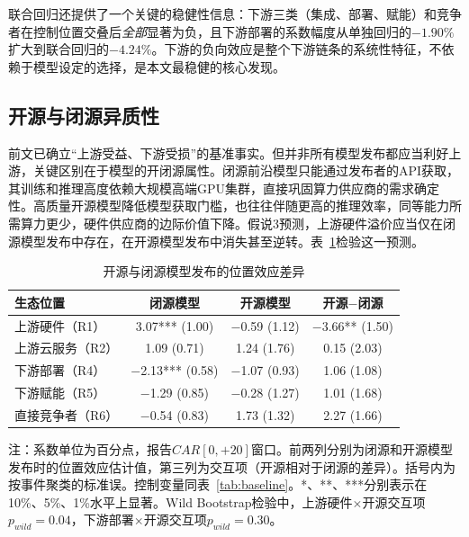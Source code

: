 \documentclass[11pt,fontset=fandol,a4paper]{ctexart}
\newcommand{\changed}[1]{{\color{orange!85!black}#1}}
\begin{document}
联合回归还提供了一个关键的稳健性信息：下游三类（集成、部署、赋能）和竞争者在控制位置交叠后\emph{全部}显著为负，且下游部署的系数幅度从单独回归的$-1.90\%$扩大到联合回归的$-4.24\%$。下游的负向效应是整个下游链条的系统性特征，不依赖于模型设定的选择，是本文最稳健的核心发现。

\subsection{开源与闭源异质性}\label{sec:openclose}

\changed{前文已确立“上游受益、下游受损”的基准事实。但并非所有模型发布都应当利好上游，关键区别在于模型的开闭源属性。闭源前沿模型只能通过发布者的API获取，其训练和推理高度依赖大规模高端GPU集群，直接巩固算力供应商的需求确定性。高质量开源模型降低模型获取门槛，也往往伴随更高的推理效率，同等能力所需算力更少，硬件供应商的边际价值下降。假说3预测，上游硬件溢价应当仅在闭源模型发布中存在，在开源模型发布中消失甚至逆转。表~\ref{tab:openclose}检验这一预测。}

\begin{table}[H]
\centering
\small
\begin{threeparttable}
\caption{开源与闭源模型发布的位置效应差异}
\label{tab:openclose}
\begin{tabular}{lccc}
\toprule
生态位置 & 闭源模型 & 开源模型 & 开源$-$闭源 \\
\midrule
上游硬件（R1） & 3.07*** (1.00) & $-$0.59 (1.12) & $-$3.66** (1.50) \\[3pt]
上游云服务（R2） & 1.09 (0.71) & 1.24 (1.76) & 0.15 (2.03) \\[3pt]
下游部署（R4） & $-$2.13*** (0.58) & $-$1.07 (0.93) & 1.06 (1.08) \\[3pt]
下游赋能（R5） & $-$1.29 (0.85) & $-$0.28 (1.27) & 1.01 (1.68) \\[3pt]
直接竞争者（R6） & $-$0.54 (0.83) & 1.73 (1.32) & 2.27 (1.66) \\
\bottomrule
\end{tabular}
\begin{tablenotes}
\footnotesize
\item 注：系数单位为百分点，报告$CAR[0,+20]$窗口。前两列分别为闭源和开源模型发布时的位置效应估计值，第三列为交互项（开源相对于闭源的差异）。括号内为按事件聚类的标准误。控制变量同表~\ref{tab:baseline}。*、**、***分别表示在10\%、5\%、1\%水平上显著。Wild Bootstrap检验中，上游硬件$\times$开源交互项$p_{wild}=0.04$，下游部署$\times$开源交互项$p_{wild}=0.30$。
\end{tablenotes}
\end{threeparttable}
\end{table}
\end{document}
